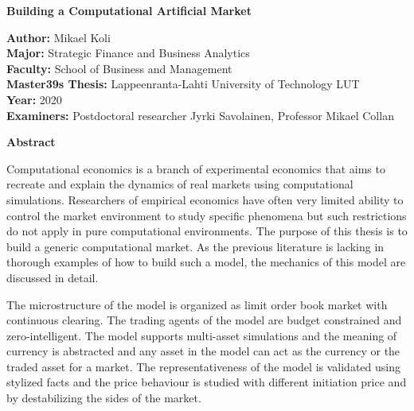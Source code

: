 \thispagestyle{plain}
\begin{center}
    \Large
    \textbf{Building a Computational Artificial Market}
        
    \vspace{0.4cm}
        
    \vspace{0.4cm}
    
    \begin{flushleft}
        \normalsize
        \textbf{Author:} Mikael Koli \\
        \textbf{Major:} Strategic Finance and Business Analytics \\
        \textbf{Faculty:} School of Business and Management \\
        \textbf{Master\char39s Thesis:} Lappeenranta-Lahti University of Technology LUT \\
        \textbf{Year:} 2020 \\
        \textbf{Examiners:} Postdoctoral researcher Jyrki Savolainen, Professor Mikael Collan
    \end{flushleft}
        
    \vspace{0.5cm}
    \textbf{Abstract}
\end{center}

Computational economics is a branch of experimental economics that aims to 
recreate and explain the dynamics of real markets using computational simulations. Researchers of
empirical economics have often very limited ability to control the market environment 
to study specific phenomena but such restrictions do not apply in pure computational
environments. The purpose of this thesis is to build a generic computational market. As the
previous literature is lacking in thorough examples of how to build such a model, the mechanics of this
model are discussed in detail. 

The microstructure of the model is organized as limit order book market with continuous 
clearing. The trading agents of the model are budget constrained and zero-intelligent. 
The model supports multi-asset simulations and the meaning of currency is 
abstracted and any asset in the model can act as the currency or the traded asset for a market. 
The representativeness of the model is validated using stylized facts and the price behaviour 
is studied with different initiation price and by destabilizing the sides of the market. 

